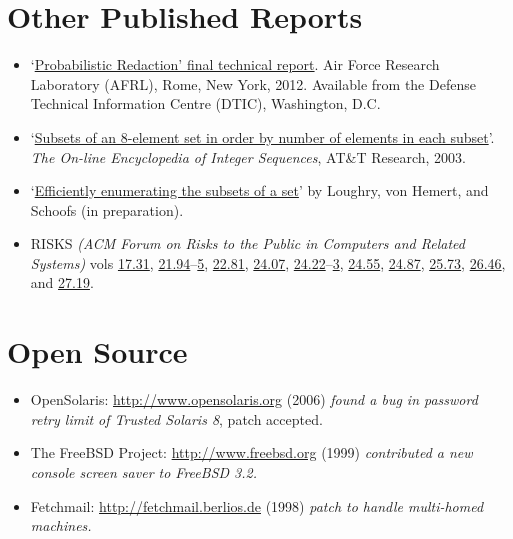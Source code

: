 \documentclass[12pt,letterpaper]{article}
\begin{document}
\vspace{-8mm}
\section*{Other Published Reports}

\begin{itemize}
	\item `\href{http://applied-math.org/Loughry2011.pdf}{Probabilistic Redaction' final
		technical report}. Air Force Research Laboratory (AFRL), Rome, New York, 2012.
		Available from the Defense Technical Information Centre (DTIC), Washington, D.C.

	\item `\href{http://oeis.org/A047869}{Subsets of an 8-element set in order by number
		of elements in each subset}'. \emph{The On-line Encyclopedia of Integer Sequences},
		AT\&T Research, 2003.

	\item `\href{http://www.applied-math.org/subset.pdf}{Efficiently enumerating the
		subsets of a set}' by Loughry, von Hemert, and Schoofs (in preparation).

    \item RISKS \emph{(ACM Forum on Risks to the Public in Computers
    and Related Systems)} vols \href{http://catless.ncl.ac.uk/Risks/17.31.html}{17.31},
	\href{http://catless.ncl.ac.uk/Risks/21.94.html}{21.94}--\href{http://catless.ncl.ac.uk/Risks/21.95.html}{5},
	\href{http://catless.ncl.ac.uk/Risks/21.81.html}{22.81},
	\href{http://catless.ncl.ac.uk/Risks/24.07.html}{24.07},
    \href{http://catless.ncl.ac.uk/Risks/24.22.html}{24.22}--\href{http://catless.ncl.ac.uk/Risks/24.23.html}{3},
	\href{http://catless.ncl.ac.uk/Risks/24.55.html}{24.55},
	\href{http://catless.ncl.ac.uk/Risks/24.87.html}{24.87},
	\href{http://catless.ncl.ac.uk/Risks/25.73.html}{25.73},
	\href{http://catless.ncl.ac.uk/Risks/26.46.html}{26.46},
	and \href{http://catless.ncl.ac.uk/Risks/27.19.html}{27.19}.
\end{itemize}

\section*{Open Source}

\begin{itemize}
	\item OpenSolaris: \url{http://www.opensolaris.org} (2006) \emph{found a bug in password
		retry limit of Trusted Solaris 8}, patch accepted.
	\item The FreeBSD Project: \url{http://www.freebsd.org} (1999) \emph{contributed a new
		console screen saver to FreeBSD 3.2.}
	\item Fetchmail: \url{http://fetchmail.berlios.de} (1998) \emph{patch to handle multi-homed
		machines.}
\end{itemize}
\end{document}

